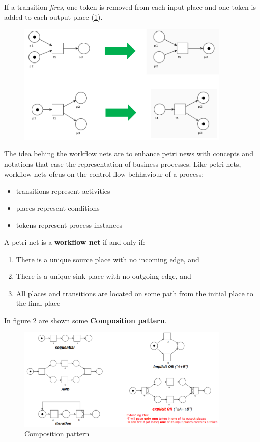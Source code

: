 \documentclass[10pt,a4paper]{report}
\begin{document}
If a transition \textit{fires}, one token is removed from each input place and one token is added to each output place (\ref{image80}).
\begin{figure}[h]
	\centering
	\includegraphics[width=0.9\textwidth]{image80}
	\caption{}
	\label{image80}
\end{figure}
The idea behing the workflow nets are to enhance petri news with concepts and notations that ease the representation of business processes. Like petri nets, workflow nets ofcus on the control flow behhaviour of a process:
\begin{itemize}
	\item transitions represent activities
	\item places represent conditions
	\item tokens represent process instances
\end{itemize}
A petri net is a \textbf{workflow net} if and only if:
\begin{enumerate}
	\item There is a unique source place with no incoming edge, and
	\item There is a unique sink place with no outgoing edge, and
	\item All places and transitions are located on some path from
	the initial place to the final place
\end{enumerate}
In figure \ref{image81} are shown some \textbf{Composition pattern}.
\begin{figure}[h]
	\centering
	\includegraphics[width=0.9\textwidth]{image81}
	\caption{Composition pattern}
	\label{image81}
\end{figure}
\end{document}
